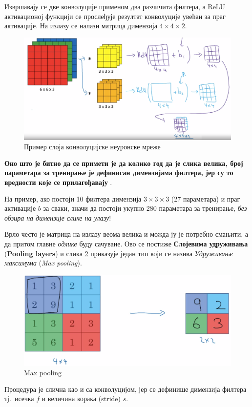 \documentclass[12pt, а4paper]{article}
\begin{document}
Извршавају се две конволуције
применом два разчичита филтера, а ReLU активационој функцији се прослеђује
резултат конволуције увећан за праг активације.
На излазу се налази матрица димензија $4 \times 4 \times 2$.

\begin{figure}[H]
  \centering
      \includegraphics[scale=0.34]{slike/ngConvLay1.png}
  \caption{Пример слоја конволуцијске неуронске мреже}
  \label{fig:ng_ConvLay1}
\end{figure}

\textbf{Оно што је битно да се примети је да колико год да је слика велика,
број параметара за тренирање је дефинисан димензијама филтера, јер
су то вредности које се прилагођавају} \cite{ngConvOneLay}.

На пример, ако постоји 10 филтера димензија $3 \times 3 \times 3$
(27 параметара) и праг активације $b$ за сваки, значи да постоји укупно
280 параметара за тренирање, \textit{без обзира на димензије слике на улазу}!

Врло често је матрица на излазу веома велика и можда ју је потребно
смањити, а да притом главне \textit{одлике} буду сачуване.
Ово се постиже \textbf{Слојевима удруживања} (\textbf{Pooling layers}) и
слика \ref{fig:ng_MaxPool} приказује један тип који се назива
\textit{Удруживање максимума} (\textit{Max pooling}).

\begin{figure}[H]
  \centering
      \includegraphics[scale=0.29]{slike/ngMaxPool.png}
  \caption{Max pooling}
  \label{fig:ng_MaxPool}
\end{figure}
Процедура је слична као
и са конволуцијом, јер се дефинише димензија филтера тј.\ исечка $f$ и величина
корака (stride) $s$.
\end{document}
